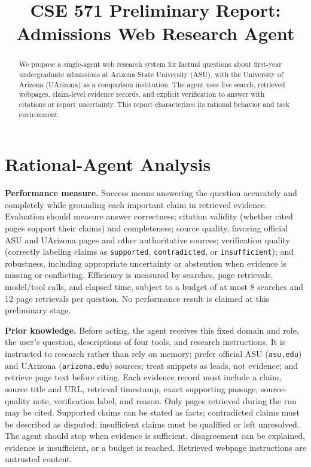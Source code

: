 \documentclass[conference]{IEEEtran}
\begin{document}
\title{CSE 571 Preliminary Report: Admissions Web Research Agent}
\author{}
\maketitle

\begin{abstract}
We propose a single-agent web research system for factual questions about first-year undergraduate admissions at Arizona State University (ASU), with the University of Arizona (UArizona) as a comparison institution. The agent uses live search, retrieved webpages, claim-level evidence records, and explicit verification to answer with citations or report uncertainty. This report characterizes its rational behavior and task environment.
\end{abstract}

\section{Rational-Agent Analysis}
\textbf{Performance measure.} Success means answering the question accurately and completely while grounding each important 
claim in retrieved evidence. Evaluation should measure answer correctness; citation validity (whether cited pages 
support their claims) and completeness; source quality, favoring official ASU and UArizona pages and other authoritative 
sources; verification quality (correctly labeling claims as \texttt{supported}, \texttt{contradicted}, or \texttt{insufficient}); 
and robustness, including appropriate uncertainty or abstention when evidence is missing or conflicting. 
Efficiency is measured by searches, page retrievals, model/tool calls, and elapsed time, subject to a budget 
of at most 8 searches and 12 page retrievals per question. No performance result is claimed at this preliminary stage.

\textbf{Prior knowledge.} Before acting, the agent receives this fixed domain and role, the user's question, 
descriptions of four tools, and research instructions. It is instructed to research rather than rely on memory; 
prefer official ASU (\texttt{asu.edu}) and UArizona (\texttt{arizona.edu}) sources; treat snippets as 
leads, not evidence; and retrieve page text before citing. Each evidence record must include a claim, 
source title and URL, retrieval timestamp, exact supporting passage, source-quality note, verification 
label, and reason. Only pages retrieved during the run may be cited. Supported claims can be stated as facts; 
contradicted claims must be described as disputed; insufficient claims must be qualified or left unresolved. 
The agent should stop when evidence is sufficient, disagreement can be explained, evidence is insufficient, 
or a budget is reached. Retrieved webpage instructions are untrusted content.
\end{document}
